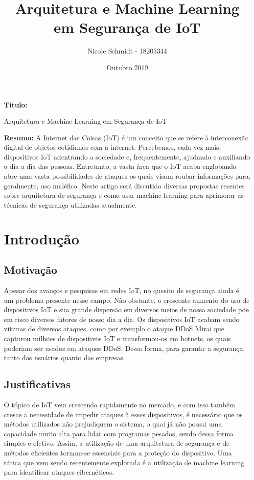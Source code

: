 \documentclass[article]{abntex2}
\title{Arquitetura e Machine Learning em Segurança de IoT}
\date{Outubro 2019}
\author{Nicole Schmidt - 18203344}
\begin{document}
\maketitle
\textbf{Titulo:}

Arquitetura e Machine Learning em Segurança de IoT

\textbf{Resumo:}
\newline
A Internet das Coisas (IoT) é um conceito que se refere à interconexão digital de objetos cotidianos com a internet. Percebemos, cada vez mais, dispositivos IoT adentrando a sociedade e, frequentemente, ajudando e auxiliando o dia a dia das pessoas. Entretanto, a vasta área que o IoT acaba englobando abre uma vasta possibilidades de ataques os quais visam roubar informações para, geralmente, uso maléfico. Neste artigo será discutido diversas propostas recentes sobre arquitetura de segurança e como usar machine learning para aprimorar as técnicas de segurança utilizadas atualmente.
\section{Introdução}
\subsection{Motivação}
Apesar dos avanços e pesquisas em redes IoT,  no quesito de segurança ainda é um problema presente nesse campo. Não obstante, o crescente aumento do uso de dispositivos IoT e sua grande dispersão em diversos meios de nossa sociedade põe em risco diversos fatores de nosso dia a dia. Os dispositivos IoT acabam sendo vítimas de diversos ataques, como por exemplo o ataque DDoS Mirai que capturou milhões de dispositivos IoT e transformou-os em botnets, os quais poderiam ser usados em ataques DDoS. Dessa forma, para garantir a segurança, tanto dos usuários quanto das empresas. 
\subsection{Justificativas}
O tópico de IoT vem crescendo rapidamente no mercado, e com isso também cresce a necessidade de impedir ataques à esses dispositivos, é necessário que os métodos utilizados não prejudiquem o sistema, o qual já não possui uma capacidade muito alta para lidar com programas pesados, sendo dessa forma simples e efetivo. Assim, a utilização de uma arquitetura de segurança e de métodos eficientes tornam-se essenciais para a proteção do dispositivo. Uma tática que vem sendo recentemente explorada é a utilização de machine learning para identificar ataques cibernéticos.
\end{document}
